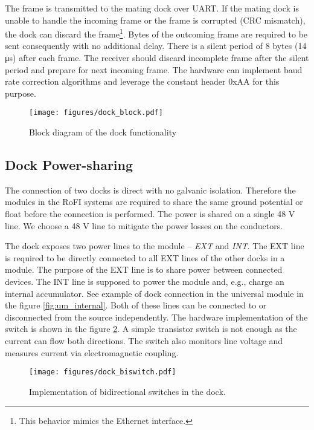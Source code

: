 The frame is transmitted to the mating dock over UART. If the mating dock is
unable to handle the incoming frame or the frame is corrupted (CRC mismatch),
the dock can discard the frame\footnote{This behavior mimics the Ethernet
interface.}. Bytes of the outcoming frame are required to be sent consequently
with no additional delay. There is a silent period of 8 bytes (14
\si{\micro\second}) after each frame. The receiver should discard incomplete
frame after the silent period and prepare for next incoming frame. The hardware
can implement baud rate correction algorithms and leverage the constant header
0xAA for this purpose.

\begin{figure}[t]
    \centering
    \texttt{[image: figures/dock\_block.pdf]}
    \caption{Block diagram of the dock functionality}
    \label{fig:dock_block}
\end{figure}

\subsection{Dock Power-sharing}

The connection of two docks is direct with no galvanic isolation. Therefore the
modules in the RoFI systems are required to share the same ground potential or
float before the connection is performed. The power is shared on a single 48 V
line. We choose a 48 V line to mitigate the power losses on the conductors.

The dock exposes two power lines to the module -- \emph{EXT} and \emph{INT}. The
EXT line is required to be directly connected to all EXT lines of the other
docks in a module. The purpose of the EXT line is to share power between
connected devices. The INT line is supposed to power the module and, e.g.,
charge an internal accumulator. See example of dock connection in the universal
module in the figure \ref{fig:um_internal}. Both of these lines can be connected
to or disconnected from the source independently. The hardware implementation of
the switch is shown in the figure \ref{fig:dock_biswitch}. A simple transistor
switch is not enough as the current can flow both directions. The switch also
monitors line voltage and measures current via electromagnetic coupling.

\begin{figure}[t]
    \centering
    \texttt{[image: figures/dock\_biswitch.pdf]}
    \caption{Implementation of bidirectional switches in the dock.}
    \label{fig:dock_biswitch}
\end{figure}

